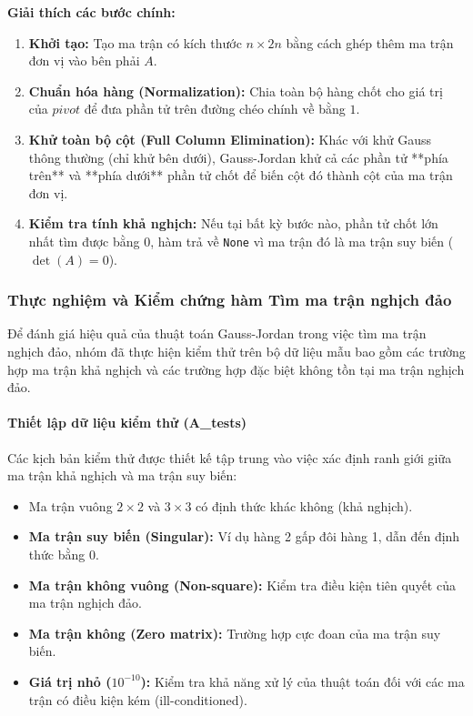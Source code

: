 \documentclass[12pt]{article}
\begin{document}
\textbf{Giải thích các bước chính:}
\begin{enumerate}
    \item \textbf{Khởi tạo:} Tạo ma trận có kích thước $n \times 2n$ bằng cách ghép thêm ma trận đơn vị vào bên phải $A$.
    \item \textbf{Chuẩn hóa hàng (Normalization):} Chia toàn bộ hàng chốt cho giá trị của $pivot$ để đưa phần tử trên đường chéo chính về bằng $1$.
    \item \textbf{Khử toàn bộ cột (Full Column Elimination):} Khác với khử Gauss thông thường (chỉ khử bên dưới), Gauss-Jordan khử cả các phần tử **phía trên** và **phía dưới** phần tử chốt để biến cột đó thành cột của ma trận đơn vị.
    \item \textbf{Kiểm tra tính khả nghịch:} Nếu tại bất kỳ bước nào, phần tử chốt lớn nhất tìm được bằng $0$, hàm trả về \texttt{None} vì ma trận đó là ma trận suy biến ($\det(A) = 0$).
\end{enumerate}

\subsubsection{Thực nghiệm và Kiểm chứng hàm Tìm ma trận nghịch đảo}

Để đánh giá hiệu quả của thuật toán Gauss-Jordan trong việc tìm ma trận nghịch đảo, nhóm đã thực hiện kiểm thử trên bộ dữ liệu mẫu bao gồm các trường hợp ma trận khả nghịch và các trường hợp đặc biệt không tồn tại ma trận nghịch đảo.

\paragraph{Thiết lập dữ liệu kiểm thử (A\_tests)}
Các kịch bản kiểm thử được thiết kế tập trung vào việc xác định ranh giới giữa ma trận khả nghịch và ma trận suy biến:
\begin{itemize}
    \item Ma trận vuông $2 \times 2$ và $3 \times 3$ có định thức khác không (khả nghịch).
    \item \textbf{Ma trận suy biến (Singular):} Ví dụ hàng 2 gấp đôi hàng 1, dẫn đến định thức bằng $0$.
    \item \textbf{Ma trận không vuông (Non-square):} Kiểm tra điều kiện tiên quyết của ma trận nghịch đảo.
    \item \textbf{Ma trận không (Zero matrix):} Trường hợp cực đoan của ma trận suy biến.
    \item \textbf{Giá trị nhỏ ($10^{-10}$):} Kiểm tra khả năng xử lý của thuật toán đối với các ma trận có điều kiện kém (ill-conditioned).
\end{itemize}
\end{document}
